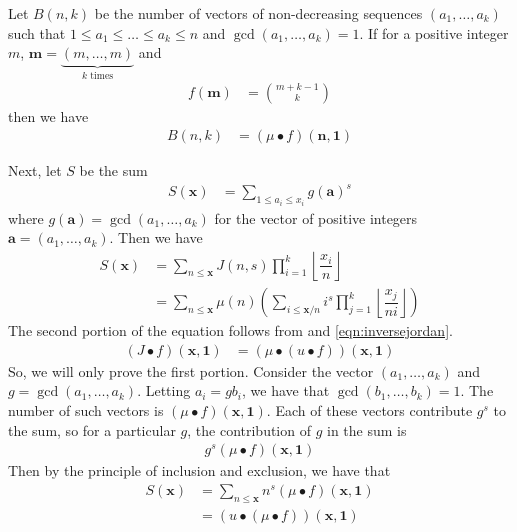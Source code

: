 \documentclass[elemannt.tex]{subfile}
\begin{document}
	Let $B(n,k)$ be the number of vectors of non-decreasing sequences $(a_{1},\ldots,a_{k})$ such that $1\leq a_{1}\leq\ldots\leq a_{k}\leq n$ and $\gcd(a_{1},\ldots,a_{k})=1$. If for a positive integer $m$, $\mathbf{m}=\underbrace{(m,\ldots,m)}_{k\mbox{ times}}$ and
		\begin{align*}
			f(\mathbf{m})
				& = \binom{m+k-1}{k}
		\end{align*}
	then we have
		\begin{align*}
			B(n,k)
				& = (\mu\bullet f)(\mathbf{n},\mathbf{1})
		\end{align*}

	Next, let $S$ be the sum
		\begin{align*}
			S(\mathbf{x})
				& = \sum_{1\leq a_i\leq x_i}g(\mathbf{a})^{s}
		\end{align*}
	where $g(\mathbf{a})=\gcd(a_{1},\ldots,a_{k})$ for the vector of positive integers $\mathbf{a}=(a_{1},\ldots,a_{k})$. Then we have
		\begin{align*}
			S(\mathbf{x})
				& = \sum_{n\leq\mathbf{x}}J(n, s)\prod_{i=1}^{k}\left\lfloor\dfrac{x_i}{n}\right\rfloor\\
				& = \sum_{n\leq\mathbf{x}}\mu(n)\left(\sum_{i\leq\mathbf{x}/n}i^{s}\prod_{j=1}^{k}\left\lfloor\dfrac{x_j}{ni}\right\rfloor\right)
		\end{align*}
	The second portion of the equation follows from  and \autoref{eqn:inversejordan}.
		\begin{align*}
			(J\bullet f)(\mathbf{x},\mathbf{1})
				& = (\mu\bullet (u\bullet f))(\mathbf{x},\mathbf{1})
		\end{align*}
	So, we will only prove the first portion. Consider the vector $(a_{1},\ldots,a_{k})$ and $g=\gcd(a_{1},\ldots,a_{k})$. Letting $a_i=gb_i$, we have that $\gcd(b_{1},\ldots,b_{k})=1$. The number of such vectors is $(\mu\bullet f)(\mathbf{x},\mathbf{1})$. Each of these vectors contribute $g^{s}$ to the sum, so for a particular $g$, the contribution of $g$ in the sum is
		\begin{align*}
			g^{s}(\mu\bullet f)(\mathbf{x},\mathbf{1})
		\end{align*}
	Then by the principle of inclusion and exclusion, we have that
		\begin{align*}
			S(\mathbf{x})
				& = \sum_{n\leq\mathbf{x}}n^{s}(\mu\bullet f)(\mathbf{x},\mathbf{1})\\
				& = (u\bullet(\mu\bullet f))(\mathbf{x},\mathbf{1})
		\end{align*}
		
\end{document}
